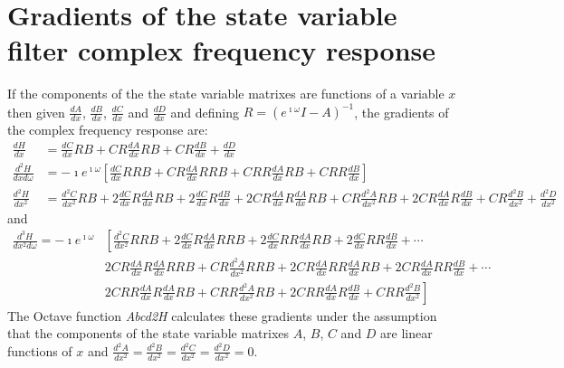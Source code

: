 \documentclass[a4paper,twoside,10pt,english]{report}
\begin{document}
\section{\label{app:State-variable-filter-gradients-complex-frequency-response}Gradients of the state variable  filter complex frequency response}
If the components of the the state variable matrixes are functions
of a variable $x$ then given $\frac{dA}{dx}$, $\frac{dB}{dx}$, $\frac{dC}{dx}$
and $\frac{dD}{dx}$ and defining $R=\left(e^{\imath\omega}I-A\right)^{-1}$, 
the gradients of the complex frequency response are:
\begin{align*}
\frac{dH}{dx}&=\frac{dC}{dx}RB+CR\frac{dA}{dx}RB+CR\frac{dB}{dx}+\frac{dD}{dx}\\
\frac{d^{2}H}{dxd\omega}&=-\imath{}e^{\imath\omega}\left[
\frac{dC}{dx}RRB+CR\frac{dA}{dx}RRB+CRR\frac{dA}{dx}RB+CRR\frac{dB}{dx}\right]\\
\frac{d^{2}H}{dx^{2}}&=\frac{d^{2}C}{dx^{2}}RB+
2\frac{dC}{dx}R\frac{dA}{dx}RB+
2\frac{dC}{dx}R\frac{dB}{dx}+
2CR\frac{dA}{dx}R\frac{dA}{dx}RB+
CR\frac{d^{2}A}{dx^{2}}RB+
2CR\frac{dA}{dx}R\frac{dB}{dx}+
CR\frac{d^{2}B}{dx^{2}}+
\frac{d^{2}D}{dx^{2}}
\end{align*}
and
\begin{align*}
\frac{d^{3}H}{dx^{2}d\omega}=-\imath{}e^{\imath\omega}&\left[
\frac{d^{2}C}{dx^{2}}RRB+
2\frac{dC}{dx}R\frac{dA}{dx}RRB+
2\frac{dC}{dx}RR\frac{dA}{dx}RB+
2\frac{dC}{dx}RR\frac{dB}{dx}+\cdots\right.\\
&\left. 2CR\frac{dA}{dx}R\frac{dA}{dx}RRB+
CR\frac{d^{2}A}{dx^{2}}RRB+
2CR\frac{dA}{dx}RR\frac{dA}{dx}RB+
2CR\frac{dA}{dx}RR\frac{dB}{dx}+\cdots\right.\\
&\left. 2CRR\frac{dA}{dx}R\frac{dA}{dx}RB+
CRR\frac{d^{2}A}{dx^{2}}RB+
2CRR\frac{dA}{dx}R\frac{dB}{dx}+
CRR\frac{d^{2}B}{dx^{2}}\right]
\end{align*}
The Octave function \emph{Abcd2H} calculates these gradients under the assumption
that the components of the state variable matrixes $A$, $B$, $C$ and $D$ are
linear functions of $x$ and $\frac{d^{2}A}{dx^{2}}=\frac{d^{2}B}{dx^{2}}=\frac{d^{2}C}{dx^{2}}=\frac{d^{2}D}{dx^{2}}=0$.
\end{document}
